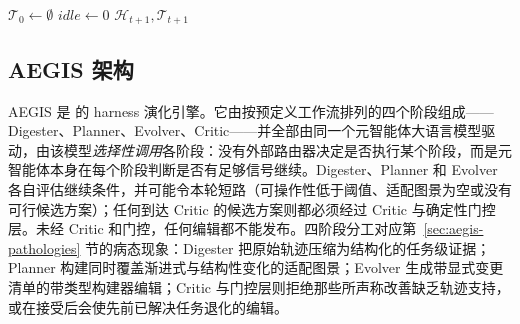 \begin{algorithm}[H]
\small
\caption{AEGIS Harness 演化循环（选择性调用）}
\label{alg:aegis-loop}
\SetAlgoLined
\LinesNumbered
{}
$\mathcal{T}_0\leftarrow\emptyset$\; $\mathit{idle}\leftarrow0$\;
\Return $\mathcal{H}_{t+1},\mathcal{T}_{t+1}$
\end{algorithm}

\subsection{AEGIS 架构}
\label{sec:aegis-arch}

AEGIS 是 \ProjectName 的 harness 演化引擎。它由按预定义工作流排列的四个阶段组成——Digester、Planner、Evolver、Critic——并全部由同一个元智能体大语言模型驱动，由该模型\textit{选择性调用}各阶段：没有外部路由器决定是否执行某个阶段，而是元智能体本身在每个阶段判断是否有足够信号继续。Digester、Planner 和 Evolver 各自评估继续条件，并可能令本轮短路（可操作性低于阈值、适配图景为空或没有可行候选方案）；任何到达 Critic 的候选方案则都必须经过 Critic 与确定性门控层。未经 Critic 和门控，任何编辑都不能发布。四阶段分工对应第~\ref{sec:aegis-pathologies} 节的病态现象：Digester 把原始轨迹压缩为结构化的任务级证据；Planner 构建同时覆盖渐进式与结构性变化的适配图景；Evolver 生成带显式变更清单的带类型构建器编辑；Critic 与门控层则拒绝那些所声称改善缺乏轨迹支持，或在接受后会使先前已解决任务退化的编辑。

